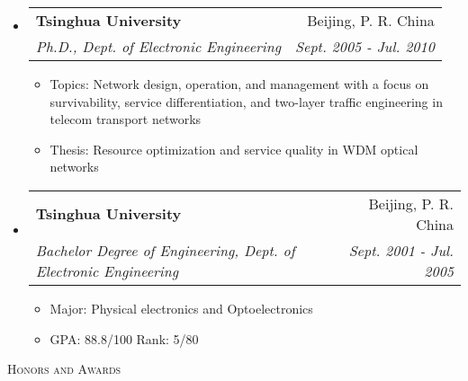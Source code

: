 \documentclass[letterpaper,11pt]{article}
\makeatletter
\newcommand{\resheading}[1]{{\noindent\large \colorbox{mygrey}{
\begin{minipage}{1.0\textwidth}{\textsc{#1 \vphantom{p\^{E}}}}\end{minipage}}}}
\newcommand{\ressubheading}[4]{
\begin{tabular*}{6.69in}{l@{\extracolsep{\fill}}r}
        \textbf{#1} & #2 \\
        \textit{#3} & \textit{#4} \\
\end{tabular*}\vspace{-6pt}
}
\newcommand{\resitem}[1]{\item #1 \vspace{-2pt}}
\makeatother
\begin{document}
\begin{itemize}%
\setlength{\itemindent}{-0.075in}

\item
    \ressubheading{Tsinghua University}{Beijing, P. R. China}
    {Ph.D., Dept. of Electronic Engineering}{Sept. 2005 - Jul. 2010} %
    \begin{itemize}
        \resitem{Topics: Network design, operation, and management with a focus on survivability, service differentiation, and two-layer traffic engineering in telecom transport networks}
        \resitem{Thesis: Resource optimization and service quality in WDM optical networks}
    \end{itemize}

\item
    \ressubheading{Tsinghua University}{Beijing, P. R. China}
    {Bachelor Degree of Engineering, Dept. of Electronic Engineering}{Sept. 2001 - Jul. 2005}%
    \begin{itemize}
        \resitem{Major: Physical electronics and Optoelectronics}
        \resitem{GPA: 88.8/100 Rank: 5/80}
    \end{itemize}

\end{itemize}



\resheading{Honors and Awards}%
\end{document}
